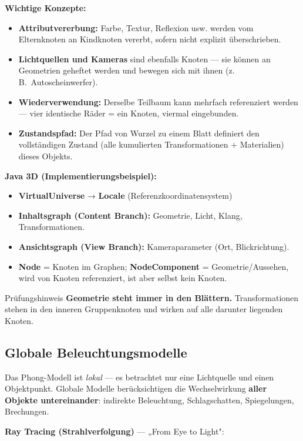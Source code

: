 \documentclass[12pt, a4paper]{article}
\begin{document}
\textbf{Wichtige Konzepte:}
\begin{itemize}
  \item \textbf{Attributvererbung:} Farbe, Textur, Reflexion usw. werden vom Elternknoten an Kindknoten vererbt, sofern nicht explizit überschrieben.
  \item \textbf{Lichtquellen und Kameras} sind ebenfalls Knoten — sie können an Geometrien geheftet werden und bewegen sich mit ihnen (z.\,B.\ Autoscheinwerfer).
  \item \textbf{Wiederverwendung:} Derselbe Teilbaum kann mehrfach referenziert werden — vier identische Räder = ein Knoten, viermal eingebunden.
  \item \textbf{Zustandspfad:} Der Pfad von Wurzel zu einem Blatt definiert den vollständigen Zustand (alle kumulierten Transformationen + Materialien) dieses Objekts.
\end{itemize}

\textbf{Java 3D (Implementierungsbeispiel):}
\begin{itemize}
  \item \textbf{VirtualUniverse} → \textbf{Locale} (Referenzkoordinatensystem)
  \item \textbf{Inhaltsgraph (Content Branch):} Geometrie, Licht, Klang, Transformationen.
  \item \textbf{Ansichtsgraph (View Branch):} Kameraparameter (Ort, Blickrichtung).
  \item \textbf{Node} = Knoten im Graphen; \textbf{NodeComponent} = Geometrie/Aussehen, wird von Knoten referenziert, ist aber selbst kein Knoten.
\end{itemize}

\begin{notebox}{Prüfungshinweis}
\textbf{Geometrie steht immer in den Blättern.} Transformationen stehen in den inneren Gruppenknoten und wirken auf alle darunter liegenden Knoten.
\end{notebox}

\subsection*{Globale Beleuchtungsmodelle}

Das Phong-Modell ist \textit{lokal} — es betrachtet nur eine Lichtquelle und einen Objektpunkt. Globale Modelle berücksichtigen die Wechselwirkung \textbf{aller Objekte untereinander}: indirekte Beleuchtung, Schlagschatten, Spiegelungen, Brechungen.

\medskip
\textbf{Ray Tracing (Strahlverfolgung)} — „From Eye to Light":
\end{document}
